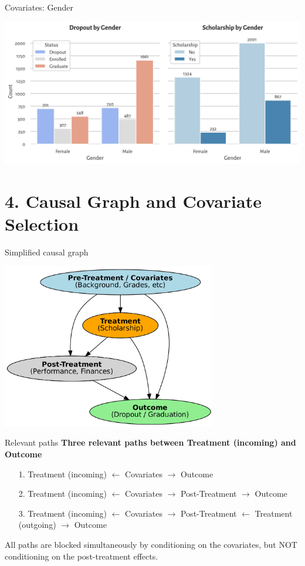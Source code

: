 \documentclass[aspectratio=169]{beamer}
\begin{document}
\begin{frame}{Covariates: Gender}
	\begin{center}
     \includegraphics[width=1\textwidth]{Tex_Pictures/Graph_gender.png}
     \end{center}
\end{frame}


\section{4. Causal Graph and Covariate Selection}

\begin{frame}{Simplified causal graph}
	\begin{center}
     \includegraphics[width=0.7\textwidth]{Tex_Pictures/DAG_simple.png}
     \end{center}
\end{frame}

\begin{frame}{Relevant paths}
\textbf{Three relevant paths between Treatment (incoming) and Outcome}
\begin{itemize}
    \item [1.] Treatment (incoming) $\leftarrow$ Covariates $\rightarrow$ Outcome
    \item [2.] Treatment (incoming) $\leftarrow$ Covariates $\rightarrow$ Post-Treatment $\rightarrow$ Outcome
    \item [3.] Treatment (incoming) $\leftarrow$ Covariates $\rightarrow$ Post-Treatment $\leftarrow$ Treatment (outgoing) $\rightarrow$ Outcome
\end{itemize}
All paths are blocked simultaneously by conditioning on the covariates, but NOT conditioning on the post-treatment effects. \

\end{frame}
\end{document}
